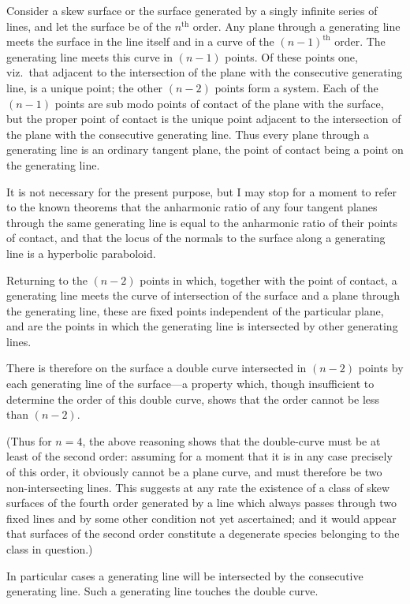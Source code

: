 \documentclass[11pt,a4paper]{article}
\theoremstyle{plain}
\begin{document}
Consider a skew surface or the surface generated by a singly infinite series of lines, and let the surface be of the $n^{\text{th}}$ order. Any plane through a generating line meets the surface in the line itself and in a curve of the $(n-1)^{\text{th}}$ order. The generating line meets this curve in $(n-1)$ points. Of these points one, viz.\ that adjacent to the intersection of the plane with the consecutive generating line, is a unique point; the other $(n-2)$ points form a system. Each of the $(n-1)$ points are sub modo points of contact of the plane with the surface, but the proper point of contact is the unique point adjacent to the intersection of the plane with the consecutive generating line. Thus every plane through a generating line is an ordinary tangent plane, the point of contact being a point on the generating line.

It is not necessary for the present purpose, but I may stop for a moment to refer to the known theorems that the anharmonic ratio of any four tangent planes through the same generating line is equal to the anharmonic ratio of their points of contact, and that the locus of the normals to the surface along a generating line is a hyperbolic paraboloid.

Returning to the $(n-2)$ points in which, together with the point of contact, a generating line meets the curve of intersection of the surface and a plane through the generating line, these are fixed points independent of the particular plane, and are the points in which the generating line is intersected by other generating lines.

There is therefore on the surface a double curve intersected in $(n-2)$ points by each generating line of the surface---a property which, though insufficient to determine the order of this double curve, shows that the order cannot be less than $(n-2)$.

(Thus for $n=4$, the above reasoning shows that the double-curve must be at least of the second order: assuming for a moment that it is in any case precisely of this order, it obviously cannot be a plane curve, and must therefore be two non-intersecting lines. This suggests at any rate the existence of a class of skew surfaces of the fourth order generated by a line which always passes through two fixed lines and by some other condition not yet ascertained; and it would appear that surfaces of the second order constitute a degenerate species belonging to the class in question.)

In particular cases a generating line will be intersected by the consecutive generating line. Such a generating line touches the double curve.
\end{document}
